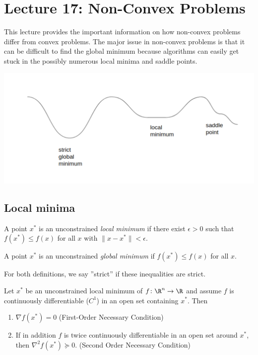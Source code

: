 

\section{Lecture 17: Non-Convex Problems}

This lecture provides the important information on how non-convex problems differ from convex problems. The major issue in non-convex problems is that it can be difficult to find the global minimum because algorithms can easily get stuck in the possibly numerous local minima and saddle points.

\begin{center}
\includegraphics[width=1.0\linewidth, height=0.4\linewidth]{figures/lecture_17_non_convex_graph.pdf} 
\end{center}

\subsection{Local minima}

\begin{definition}
A point $x^*$ is an unconstrained \textit{local minimum} if there exist $\epsilon > 0$ such that $f(x^*) \le f(x)$ for all $x$ with $\|x - x^*\| < \epsilon$.
\end{definition}

\begin{definition}
A point $x^*$ is an unconstrained \textit{global minimum} if $f(x^*) \le f(x)$ for all $x$.
\end{definition}

For both definitions, we say ''strict'' if these inequalities are strict.

\begin{proposition}
Let $x^*$ be an unconstrained local minimum of $f\colon \R^n \to\R$ and assume $f$ is continuously differentiable ($C^1$) in an open set containing $x^*$. Then
\begin{enumerate}
    \item $\nabla f(x^*) = 0$ (First-Order Necessary Condition)
    \item If in addition $f$ is twice continuously differentiable in an open set around $x^*$, then $\nabla^2f(x^*) \succeq 0$. (Second Order Necessary Condition)
\end{enumerate}
\end{proposition}

